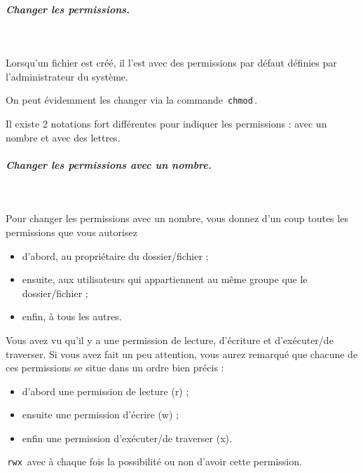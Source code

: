 \documentclass[11pt,a4paper]{article}
\begin{document}
            \par
        
			
		\subparagraph{Changer les permissions.} 
		
					\textcolor{white}{.} \par
				
            \par
        
					Lorsqu'un fichier est cr\'e\'e, il l'est avec des permissions par d\'efaut d\'efinies par l'administrateur du syst\`eme.
				
            \par
        
				  On peut \'evidemment les changer via la commande \,\verb|chmod|\,.
				
            \par
        
				  Il existe 2 notations fort diff\'erentes pour indiquer les permissions : avec un nombre et avec des lettres.
				
            \par
        
			
		\subparagraph{Changer les permissions avec un nombre.} 
		
					\textcolor{white}{.} \par
				
            \par
        
				  Pour changer les permissions avec un nombre, vous donnez d'un coup toutes les permissions que vous autorisez 
				  
					\begin{itemize}
				
			\item d'abord, au propri\'etaire du dossier/fichier ;
			\item ensuite, aux utilisateurs qui appartiennent au m\^eme groupe que le dossier/fichier ;
			\item enfin, \`a tous les autres. 
					\end{itemize}
				
          Vous avez vu qu'il y a une permission de lecture, d'\'ecriture et d'ex\'ecuter/de traverser.
          Si vous avez fait un peu attention, vous aurez remarqu\'e que chacune de ces permissions se situe dans un ordre bien pr\'ecis :
          
					\begin{itemize}
				
			\item d'abord une permission de lecture (r) ;
			\item ensuite une permission d'\'ecrire (w) ;
			\item enfin une permission d'ex\'ecuter/de traverser (x). 
					\end{itemize}
				\,\verb|rwx|\, avec \`a chaque fois la possibilit\'e ou non d'avoir cette permission.
				
\end{document}
